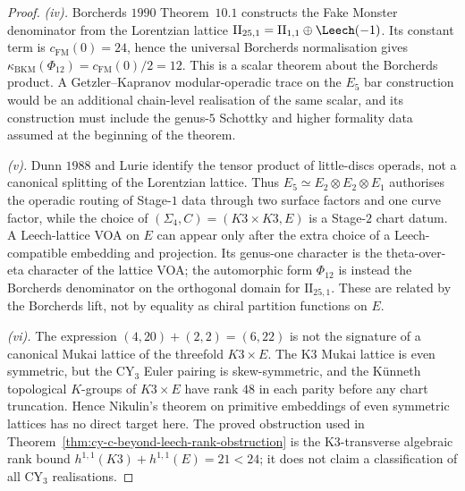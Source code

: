 \begin{proof}
\emph{(iv).} Borcherds $1990$ Theorem~$10.1$ constructs the Fake
Monster denominator from the Lorentzian lattice
$\mathrm{II}_{25,1}=\mathrm{II}_{1,1}\oplus\Leech(-1)$. Its constant
term is $c_{\mathrm{FM}}(0)=24$, hence the universal Borcherds
normalisation gives
$\kappa_{\mathrm{BKM}}(\Phi_{12})=c_{\mathrm{FM}}(0)/2=12$.
This is a scalar theorem about the Borcherds product. A
Getzler--Kapranov modular-operadic trace on the $E_5$ bar construction
would be an additional chain-level realisation of the same scalar, and
its construction must include the genus-$5$ Schottky and higher
formality data assumed at the beginning of the theorem.

\emph{(v).} Dunn $1988$ and Lurie identify the tensor product of
little-discs operads, not a canonical splitting of the Lorentzian
lattice. Thus \(E_5\simeq E_2\otimes E_2\otimes E_1\) authorises the
operadic routing of Stage-$1$ data through two surface factors and one
curve factor, while the choice of
\((\Sigma_4,C)=(K3\times K3,E)\) is a Stage-$2$ chart datum. A
Leech-lattice VOA on \(E\) can appear only after the extra choice of a
Leech-compatible embedding and projection. Its genus-one character is
the theta-over-eta character of the lattice VOA; the automorphic form
\(\Phi_{12}\) is instead the Borcherds denominator on the orthogonal
domain for \(\mathrm{II}_{25,1}\). These are related by the Borcherds
lift, not by equality as chiral partition functions on \(E\).

\emph{(vi).} The expression
\((4,20)+(2,2)=(6,22)\) is not the signature of a canonical Mukai
lattice of the threefold \(K3\times E\). The K3 Mukai lattice is even
symmetric, but the CY$_3$ Euler pairing is skew-symmetric, and the
K\"unneth topological \(K\)-groups of \(K3\times E\) have rank \(48\)
in each parity before any chart truncation. Hence Nikulin's theorem on
primitive embeddings of even symmetric lattices has no direct target
here. The proved obstruction used in
Theorem~\ref{thm:cy-c-beyond-leech-rank-obstruction} is the
K3-transverse algebraic rank bound \(h^{1,1}(K3)+h^{1,1}(E)=21<24\);
it does not claim a classification of all CY$_3$ realisations.
\end{proof}

